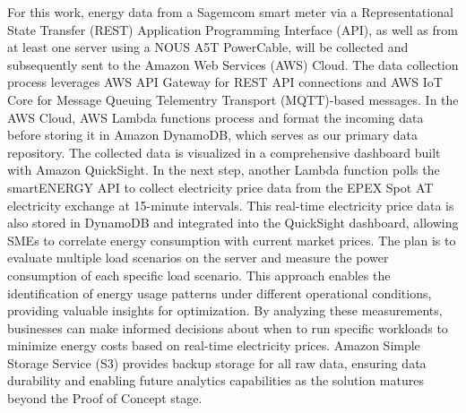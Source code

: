 For this work, energy data from a Sagemcom smart meter via a Representational State Transfer (REST) Application Programming Interface (API),
as well as from at least one server using a NOUS A5T PowerCable, will be collected and subsequently sent to the Amazon Web Services (AWS) Cloud.
The data collection process leverages AWS API Gateway for REST API connections and AWS IoT Core for Message Queuing Telementry Transport (MQTT)-based messages.
In the AWS Cloud, AWS Lambda functions process and format the incoming data before storing it in Amazon DynamoDB, which serves as our primary data repository. 
The collected data is visualized in a comprehensive dashboard built with Amazon QuickSight. In the next step, 
another Lambda function polls the smartENERGY API to collect electricity price data from the EPEX Spot AT electricity exchange at 15-minute intervals. 
This real-time electricity price data is also stored in DynamoDB and integrated into the QuickSight dashboard, allowing SMEs to correlate energy consumption with current market prices. 
The plan is to evaluate multiple load scenarios on the server and measure the power consumption of each specific load scenario.
This approach enables the identification of energy usage patterns under different operational conditions, providing valuable insights for optimization.
By analyzing these measurements, businesses can make informed decisions about when to run specific workloads to minimize energy costs based on real-time electricity prices.
Amazon Simple Storage Service (S3) provides backup storage for all raw data,
ensuring data durability and enabling future analytics capabilities as the solution matures beyond the Proof of Concept stage.